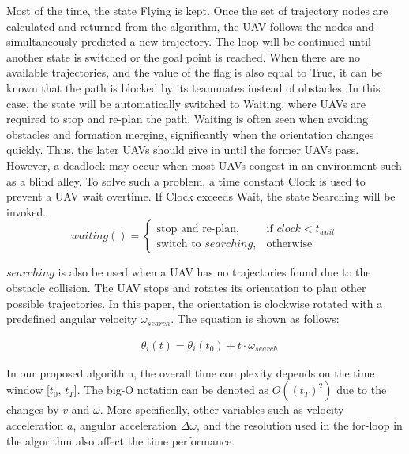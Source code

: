 Most of the time, the state Flying is kept.
Once the set of trajectory nodes are calculated and returned from the algorithm, the UAV follows the nodes and simultaneously predicted a new trajectory. The loop will be continued until another state is switched or the goal point is reached. When there are no available trajectories, and the value of the flag is also equal to True, it can be known that the path is blocked by its teammates instead of obstacles. In this case, the state will be automatically switched to Waiting, where UAVs are required to stop and re-plan the path. Waiting is often seen when avoiding obstacles and formation merging, significantly when the orientation changes quickly. Thus, the later UAVs should give in until the former UAVs pass. However, a deadlock may occur when most UAVs congest in an environment such as a blind alley. To solve such a problem, a time constant Clock is used to prevent a UAV wait overtime. If Clock
exceeds Wait, the state Searching will be invoked.
\[
    waiting()= 
\begin{cases}
    \text{stop and re-plan},& \text{if } clock<t_{wait}\\
    \text{switch to } searching, & \text{otherwise}
\end{cases}
\]

$searching$ is also be used when a UAV has no trajectories found due to the obstacle collision. The UAV stops and rotates its orientation to plan other possible trajectories. In this paper, the orientation is clockwise rotated with a predefined angular velocity $\omega_{search}$. The equation is shown as follows:

\begin{equation} 
\begin{aligned}
& \theta_{i}(t) = \theta_{i}(t_{0}) + t \cdot \omega_{search}
\end{aligned}
\end{equation}

In our proposed algorithm, the overall time complexity depends on the time window [$t_{0}$, $t_{T}$]. The big-O notation can be denoted as $O((t_{T})^2)$ due to the changes by $v$ and $\omega$. More specifically, other variables such as velocity acceleration $a$, angular acceleration $\Delta\omega$, and the resolution used in the for-loop in the algorithm also affect the time performance.



